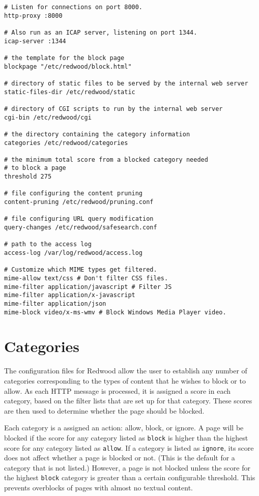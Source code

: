 \documentclass{article}
\begin{document}
\begin{verbatim}
# Listen for connections on port 8000.
http-proxy :8000

# Also run as an ICAP server, listening on port 1344.
icap-server :1344

# the template for the block page
blockpage "/etc/redwood/block.html"

# directory of static files to be served by the internal web server
static-files-dir /etc/redwood/static

# directory of CGI scripts to run by the internal web server
cgi-bin /etc/redwood/cgi

# the directory containing the category information
categories /etc/redwood/categories

# the minimum total score from a blocked category needed 
# to block a page
threshold 275

# file configuring the content pruning
content-pruning /etc/redwood/pruning.conf

# file configuring URL query modification
query-changes /etc/redwood/safesearch.conf

# path to the access log
access-log /var/log/redwood/access.log

# Customize which MIME types get filtered.
mime-allow text/css # Don't filter CSS files.
mime-filter application/javascript # Filter JS
mime-filter application/x-javascript
mime-filter application/json
mime-block video/x-ms-wmv # Block Windows Media Player video.
\end{verbatim}

\section{Categories}

The configuration files for Redwood allow the user to establish any number of categories 
corresponding to the types of content that he wishes to block or to allow. 
As each HTTP message is processed, it is assigned a score in each category, 
based on the filter lists that are set up for that category. 
These scores are then used to determine whether the page should be blocked.

Each category is a assigned an action: allow, block, or ignore. 
A page will be blocked if the score for any category listed as \verb"block" 
is higher than the highest score for any category listed as \verb"allow". 
If a category is listed as \verb"ignore", its score does not affect whether a page 
is blocked or not. (This is the default for a category that is not listed.) 
However, a page is not blocked unless the score for the highest \verb"block" category
is greater than a certain configurable threshold. This prevents overblocks 
of pages with almost no textual content.
\end{document}
